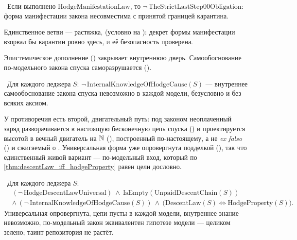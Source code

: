 \begin{theorem}\label{thm:hodgeManifestationLaw_refutes_boundary}
\green{}\ Если выполнено $\mathrm{HodgeManifestationLaw}$, то
$\neg\,\mathrm{TheStrictLastStep00Obligation}$: форма манифестации закона несовместима с принятой
границей карантина.
\end{theorem}

Единственное \yellow{} ветви --- растяжка,
 (условно на \axiom{}): декрет формы
манифестации взорвал бы карантин ровно здесь, и её безопасность проверена.

Эпистемическое дополнение () закрывает внутреннюю дверь.
Самообоснование по-модельного закона спуска саморазрушается ().

\begin{theorem}\label{thm:hodgeCause_unknowable}
\green{}\ Для каждого леджера $S$: $\neg\,\mathrm{InternalKnowledgeOfHodgeCause}(S)$ --- внутреннее
самообоснование закона спуска невозможно в каждой модели, безусловно и без всяких аксиом.
\end{theorem}

У противоречия есть второй, двигательный путь: под законом неоплаченный заряд разворачивается в
настоящую бесконечную цепь спуска () и проектируется высотой в
вечный двигатель на $\mathbb{N}$ (), построенный
по-настоящему, а не \emph{ex falso} () и сжигаемый о
. Универсальная форма уже опровергнута подделкой
(), так что единственный живой вариант --- по-модельный вход,
который по \cref{thm:descentLaw_iff_hodgeProperty} равен цели дословно.

\begin{theorem}\label{thm:hodge_locked_behind_engine_status}
\green{}\ Для каждого леджера $S$:
\begin{equation}\label{eq:hodge_locked}
\begin{aligned}
  &(\neg\,\mathrm{HodgeDescentLawUniversal})\ \wedge\ \mathrm{IsEmpty}(\mathrm{UnpaidDescentChain}(S))\\
  &\wedge\ (\neg\,\mathrm{InternalKnowledgeOfHodgeCause}(S))\ \wedge\ \bigl(\mathrm{DescentLaw}(S)\iff\mathrm{HodgeProperty}(S)\bigr).
\end{aligned}
\end{equation}
Универсальная опровергнута, цепи пусты в каждой модели, внутреннее знание невозможно, по-модельный
закон эквивалентен гипотезе модели --- целиком зелено; таинт репозитория не растёт.
\end{theorem}

